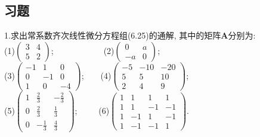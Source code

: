 \documentclass[titlepage,11pt,a4paper,twoside]{report}
\begin{document}
\subsection{习题}
1.求出常系数齐次线性微分方程组(6.25)的通解, 其中的矩阵$\bm{A}$分别为:\\
(1)$\displaystyle\begin{pmatrix}3&4\\5&2\end{pmatrix}$;$\quad\quad\quad\quad\quad\quad$(2)$\displaystyle\begin{pmatrix}0&a\\-a&0\end{pmatrix}$;\\
(3)$\displaystyle\begin{pmatrix}-1&1&0\\0&-1&0\\1&0&-4\end{pmatrix}$;$\quad\quad$(4)$\displaystyle\begin{pmatrix}-5&-10&-20\\5&5&10\\2&4&9\end{pmatrix}$;\\
(5)$\displaystyle\begin{pmatrix}1&\frac{2}{3}&-\frac{2}{3}\\0&\frac{2}{3}&\frac{1}{3}\\0&-\frac{1}{3}&\frac{4}{3}\end{pmatrix}$;$\quad\quad\;\;$(6)$\displaystyle\begin{pmatrix}1&1&1&1\\1&1&-1&-1\\1&-1&1&-1\\1&-1&-1&1\end{pmatrix}$.
\end{document}
